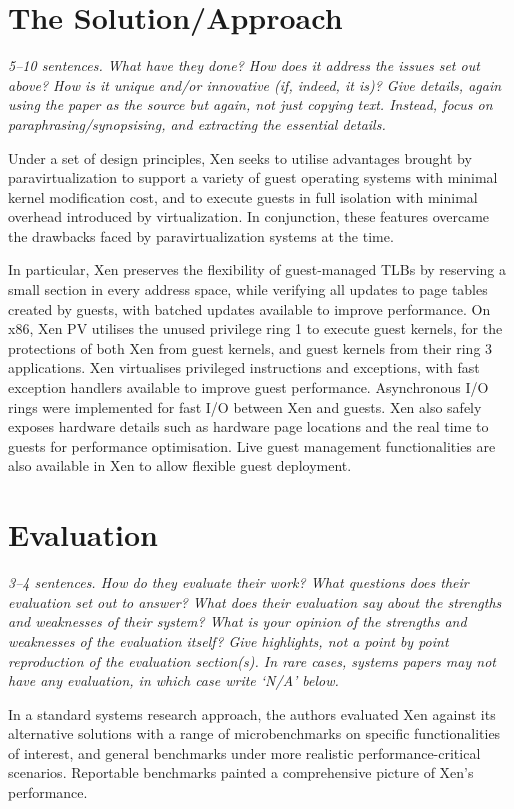 \documentclass[11pt]{article}
\begin{document}
\section*{The Solution/Approach}
\textsl{5--10 sentences. What have they done? How does it address the issues set out above? How is it unique and/or innovative (if, indeed, it is)? Give details, again using the paper as the source but again, not just copying text. Instead, focus on paraphrasing/synopsising, and extracting the essential details.}

Under a set of design principles, Xen seeks to utilise advantages brought by paravirtualization to support a variety of guest operating systems with minimal kernel modification cost, and to execute guests in full isolation with minimal overhead introduced by virtualization. In conjunction, these features overcame the drawbacks faced by paravirtualization systems at the time.

In particular, Xen preserves the flexibility of guest-managed TLBs by reserving a small section in every address space, while verifying all updates to page tables created by guests, with batched updates available to improve performance. On x86, Xen PV utilises the unused privilege ring 1 to execute guest kernels, for the protections of both Xen from guest kernels, and guest kernels from their ring 3 applications. Xen virtualises privileged instructions and exceptions, with fast exception handlers available to improve guest performance. Asynchronous I/O rings were implemented for fast I/O between Xen and guests. Xen also safely exposes hardware details such as hardware page locations and the real time to guests for performance optimisation. Live guest management functionalities are also available in Xen to allow flexible guest deployment.

\section*{Evaluation}
\textsl{3--4 sentences. How do they evaluate their work? What questions does their evaluation set out to answer? What does their evaluation say about the strengths and weaknesses of their system? What is your opinion of the strengths and weaknesses of the evaluation itself?  Give highlights, not a point by point reproduction of the evaluation section(s). In rare cases, systems papers may not have any evaluation, in which case write `N/A' below.}

In a standard systems research approach, the authors evaluated Xen against its alternative solutions with a range of microbenchmarks on specific functionalities of interest, and general benchmarks under more realistic performance-critical scenarios. Reportable benchmarks painted a comprehensive picture of Xen's performance.
\end{document}
